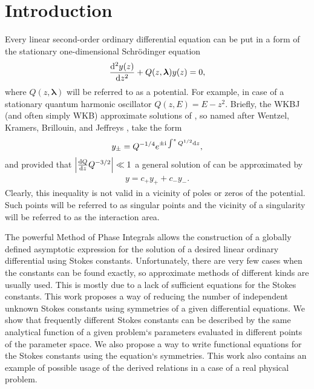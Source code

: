 \documentclass[12pt]{iopart}
\def\lmbd{\bm{\lambda}}
\begin{document}
\section{Introduction \label{sec:intro}}
Every linear second-order ordinary differential equation can be put in a form of the stationary one-dimensional Schr\"odinger equation
\begin{eqnarray}
\frac{\rmd^2 y(z)}{\rmd z^2} + Q(z,\lmbd)y(z) = 0,   \label{eq:gen}
\end{eqnarray}
where \mbox{$Q(z,\lmbd)$} will be referred to as a potential. For example, in case of a stationary quantum harmonic oscillator \mbox{$Q(z,E)=E-z^2$}. Briefly, the WKBJ (and often simply WKB) 
approximate solutions of , so named after
Wentzel, Kramers, Brillouin, and Jeffreys \cite{wkb1,wkb2,wkb3,wkbj}, take the form
\begin{eqnarray}
y_\pm = Q^{-1/4} e^{\pm \mathrm{i} \int^z Q^{1/2} \mathrm{d} z},   \label{eq:wkb}
\end{eqnarray}
and provided that
$\left|\frac{\mathrm{d} Q}{\mathrm{d} z}Q^{-3/2}\right| \ll 1 $
a general solution of  can be approximated by
\begin{eqnarray}
y = c_+y_+ + c_-y_-. \label{eq:gensol}
\end{eqnarray}
Clearly, this inequality is not valid in a vicinity of poles or zeros of the potential. Such points will be referred to as singular points and the vicinity of a singularity will be referred to as the interaction area.


The powerful Method of Phase Integrals allows the construction of a globally defined asymptotic expression for the solution of a desired linear ordinary differential using Stokes constants. Unfortunately, there are very few cases when the constants can be found exactly, so approximate methods of different kinds \cite{white,ours} are usually used. This is mostly due to a lack of sufficient equations for the Stokes constants. This work proposes a way of reducing the number of independent unknown Stokes constants using symmetries of a given differential equations. We show that frequently different Stokes constants can be described by the same analytical function of a given problem`s parameters evaluated in different points of the parameter space.  We also propose a way to write functional equations for the Stokes constants using the equation`s symmetries. This work also contains an example of possible usage of the derived relations in a case of a real physical problem. 
\end{document}
